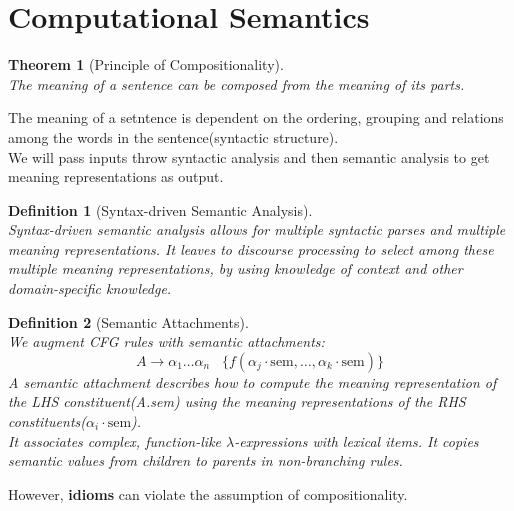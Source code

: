 \documentclass[12pt]{article}
\newtheorem{definition}{Definition}[section]
\newtheorem{theorem}{Theorem}[section]
\theoremstyle{definition}
\begin{document}
\section{Computational Semantics}
\begin{theorem}[Principle of Compositionality]
\hfill\\\normalfont The meaning of a sentence can be composed from the meaning of its parts.
\end{theorem}
The meaning of a setntence is dependent on the ordering, grouping and relations among the words in the sentence(syntactic structure).\\
We will pass inputs throw syntactic analysis and then semantic analysis to get meaning representations as output.
\begin{definition}[Syntax-driven Semantic Analysis]
\hfill\\\normalfont Syntax-driven semantic analysis allows for multiple syntactic parses and multiple meaning representations. It leaves to discourse processing to select among these multiple meaning representations, by using knowledge of context and other domain-specific knowledge.
\end{definition}
\begin{definition}[Semantic Attachments]
\hfill\\\normalfont We augment CFG rules with semantic attachments:
\[
A\to\alpha_1\ldots\alpha_n\;\;\;\{f(\alpha_j\cdot \text{sem}, \ldots, \alpha_k\cdot\text{sem})\}
\]
A semantic attachment describes how to compute the meaning representation of the LHS constituent(A.sem) using the meaning representations of the RHS constituents($\alpha_i\cdot\text{sem}$).\\
It associates complex, function-like $\lambda$-expressions with lexical items. It copies semantic values from children to parents in non-branching rules.
\end{definition}
However, \textbf{idioms} can violate the assumption of compositionality.
\clearpage
\end{document}
